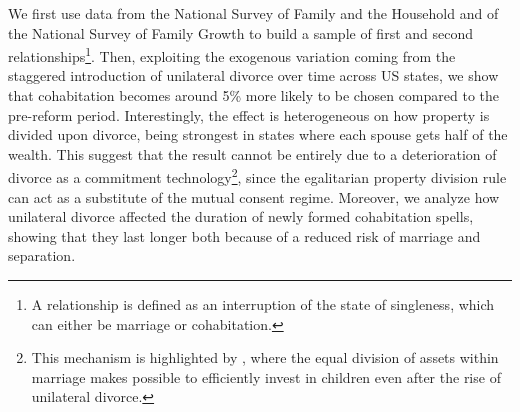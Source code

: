 \documentclass[12pt]{article}
\numberwithin{table}{section}
\begin{document}
We first use data from the National Survey of Family and the Household and of the National Survey of Family Growth to build a sample of first and second relationships\footnote{A relationship is defined as an interruption of the state of singleness, which can either be marriage or cohabitation.}. Then, exploiting the exogenous variation coming from the staggered introduction of unilateral divorce over time across US states, we show that cohabitation becomes around 5\% more likely  to be chosen compared to the pre-reform period. Interestingly,  the effect is heterogeneous on how property is divided upon divorce, being strongest in states where each spouse gets half of the wealth. This suggest that the result cannot be entirely due to a deterioration of divorce as a commitment technology\footnote{This mechanism is highlighted by \cite{lafortune2019}, where the equal division of assets within marriage makes possible to efficiently invest in children even after the rise of unilateral divorce.}, since the egalitarian property division rule can act as a substitute of the mutual consent regime. Moreover, we analyze how unilateral divorce affected the duration of newly formed cohabitation spells, showing that they last longer both because of a reduced risk of marriage and separation.
\end{document}
